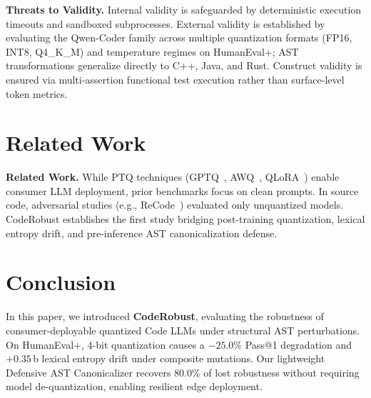 \documentclass[11pt,twocolumn]{article}
\begin{document}
\noindent\textbf{Threats to Validity.} Internal validity is safeguarded by deterministic execution timeouts and sandboxed subprocesses. External validity is established by evaluating the Qwen-Coder family across multiple quantization formats (FP16, INT8, Q4\_K\_M) and temperature regimes on HumanEval+; AST transformations generalize directly to C++, Java, and Rust. Construct validity is ensured via multi-assertion functional test execution rather than surface-level token metrics.

\section{Related Work}
\label{sec:related}

\noindent\textbf{Related Work.} While PTQ techniques (GPTQ~\cite{frantar2022gptq}, AWQ~\cite{lin2023awq}, QLoRA~\cite{dettmers2023qlora}) enable consumer LLM deployment, prior benchmarks focus on clean prompts. In source code, adversarial studies (e.g., ReCode~\cite{wang2023recode}) evaluated only unquantized models. CodeRobust establishes the first study bridging post-training quantization, lexical entropy drift, and pre-inference AST canonicalization defense.

\section{Conclusion}
\label{sec:conclusion}

In this paper, we introduced \textbf{CodeRobust}, evaluating the robustness of consumer-deployable quantized Code LLMs under structural AST perturbations. On HumanEval+, 4-bit quantization causes a $-25.0\%$ Pass@1 degradation and $+0.35$\,b lexical entropy drift under composite mutations. Our lightweight Defensive AST Canonicalizer recovers $80.0\%$ of lost robustness without requiring model de-quantization, enabling resilient edge deployment.
\end{document}
